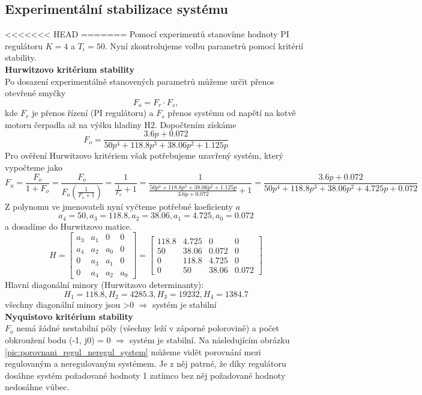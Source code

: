 \documentclass{article}
\begin{document}
		\subsection{Experimentální stabilizace systému}
<<<<<<< HEAD
=======
			Pomocí experimentů stanovíme hodnoty PI regulátoru \(K=4\) a \(T_{i}=50\). Nyní zkontrolujeme volbu parametrů pomocí kritérií stability.\\
			\textbf{Hurwitzovo kritérium stability}\\
			Po dosazení experimentálně stanovených parametrů můžeme určit přenos otevřené smyčky
			\[F_{o}=F_{r}\cdot F_{s},\]
			kde \(F_{r}\) je přenos řízení (PI regulátoru) a \(F_{s}\) přenos systému od napětí na kotvě motoru čerpadla až na výšku hladiny H2. Dopočtením získáme
			\[F_{o}=\frac{3.6p + 0.072}{50p^{4} + 118.8p^{3} + 38.06p^{2} + 1.125p}\]
			Pro ověření Hurwitzovo kritériem však potřebujeme uzavřený systém, který vypočteme jako
			\[F_{u}=\frac{F_{o}}{1+F_{o}}=\frac{F_{o}}{F_{o}(\frac{1}{F_{o}+1})}=\frac{1}{\frac{1}{F_{o}}+1}=\frac{1}{\frac{50p^{4} + 118.8p^{3} + 38.06p^{2} + 1.125p}{3.6p + 0.072}+1}=\frac{3.6p + 0.072}{50p^{4} + 118.8p^{3} + 38.06p^{2} + 4.725p + 0.072}\]
			Z polynomu ve jmenovateli nyní vyčteme potřebné koeficienty \(a\)
			\[a_{4}=50, a_{3}=118.8, a_{2}=38.06, a_{1}=4.725, a_{0}=0.072\]
			a dosadíme do Hurwitzovo matice.
			\[H=\begin{bmatrix}
				a_{3}&a_{1}&0&0\\
				a_{4}&a_{2}&a_{0}&0\\
				0&a_{3}&a_{1}&0\\
				0&a_{4}&a_{2}&a_{0}
			\end{bmatrix}=\begin{bmatrix}
				118.8&4.725&0&0\\
				50&38.06&0.072&0\\
				0&118.8&4.725&0\\
				0&50&38.06&0.072
			\end{bmatrix}\]
			Hlavní diagonální minory (Hurwitzovo determinanty):
			\[H_{1}=118.8, H_{2}=4285.3, H_{3}=19232, H_{4}=1384.7\]
			\hspace{5cm} všechny diagonální minory jsou \textgreater 0 $\Rightarrow$ systém je stabilní\\
			\textbf{Nyquistovo kritérium stability}\\
			\(F_{o}\) nemá žádné nestabilní póly (všechny leží v záporné polorovině) a počet obkroužení bodu  (-1, j0) = 0 $\Rightarrow$ systém je stabilní.
			Na následujícím obrázku \ref{pic:porovnani_regul_neregul_system} můžeme vidět porovnání mezi regulovaným a neregulovaným systémem. Je z něj patrné, že díky regulátoru dosáhne systém požadované hodnoty 1 zatímco bez něj požadované hodnoty nedosáhne vůbec.\\
\end{document}
